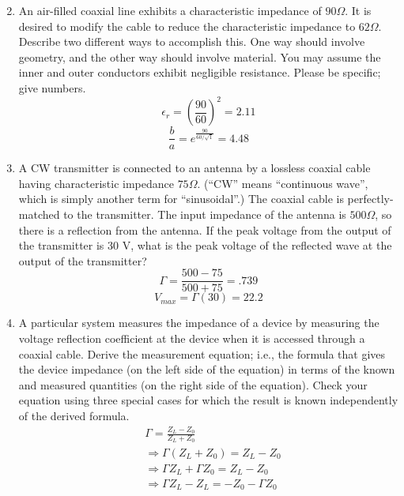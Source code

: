 \documentclass{article}
\begin{document}
\begin{enumerate}
\begin{equation}
   \end{equation}
   \item An air-filled coaxial line exhibits a characteristic impedance of $90 \Omega$. It is desired to modify the cable to reduce the characteristic impedance to $62\Omega$. Describe two different ways to accomplish this. One way should involve geometry, and the other way should involve material. You may assume the inner and outer conductors exhibit negligible resistance. Please be specific; give numbers.
   \begin{equation}
       \epsilon_r = \left(\frac{90}{60}\right)^2 = \boxed{2.11}
   \end{equation}
   \begin{equation}
       \frac{b}{a} = e^{\frac{90}{60/\sqrt{1}}} = \boxed{4.48}
   \end{equation}
   \item A CW transmitter is connected to an antenna by a lossless coaxial cable having characteristic impedance $75 \Omega$. (“CW” means “continuous wave”, which is simply another term for “sinusoidal”.) The coaxial cable is perfectly-matched to the transmitter. The input impedance of the antenna is $500 \Omega$, so there is a reflection from the antenna. If the peak voltage from the output of the transmitter is 30 V, what is the peak voltage of the reflected wave at the output of the transmitter?
   \begin{equation}
       \Gamma = \frac{500 - 75}{500 + 75} = .739
   \end{equation}
   \begin{equation}
       V_{max}  = \Gamma (30) = \boxed{22.2}
   \end{equation}
   \item A particular system measures the impedance of a device by measuring the voltage reflection coefficient at the device when it is accessed through a coaxial cable. Derive the measurement equation; i.e., the formula that gives the device impedance (on the left side of the equation) in terms of the known and measured quantities (on the right side of the equation). Check your equation using three special cases for which the result is known independently of the derived formula.
   \begin{align}
   &\Gamma = \frac{Z_L - Z_0}{Z_L + Z_0}\\
   &\Rightarrow\Gamma(Z_L + Z_0) = Z_L - Z_0\\
   &\Rightarrow\Gamma Z_L + \Gamma Z_0 = Z_L - Z_0\\
   &\Rightarrow\Gamma Z_L - Z_L  =  -Z_0 - \Gamma Z_0\\

\end{align}
\end{enumerate}
\end{document}
